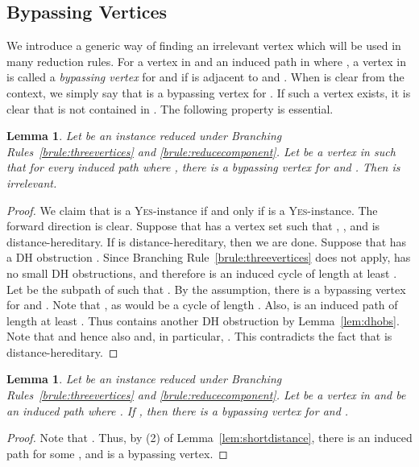 \documentclass[11pt]{elsarticle}
\newtheorem{lemma}[theorem]{Lemma}
\newcommand{\YES}{\textsc{Yes}}
\begin{document}
\subsection{Bypassing Vertices}\label{subsec:bypassing}

We introduce a generic way of finding an irrelevant vertex which will be used in many reduction rules.
For a vertex  in  and an induced path  in  where ,
a vertex  in  is called a \emph{bypassing vertex} for  and  if  is adjacent to  and . 
When  is clear from the context, we simply say that  is a bypassing vertex for . 
If such a vertex  exists, it is clear that  is not contained in .
The following property is essential.

\begin{lemma}
\label{lem:badvertex}
Let  be an instance reduced under Branching Rules~\ref{brule:threevertices} and \ref{brule:reducecomponent}.
Let  be a vertex in  such that for every induced path  where , 
there is a bypassing vertex for  and .
Then  is irrelevant.
\end{lemma}
\begin{proof}
We claim that  is a \YES-instance if and only if  is a \YES-instance.
The forward direction is clear.
Suppose that  has a vertex set  such that , , and  is distance-hereditary. 
If  is distance-hereditary, then we are done.
Suppose that  has a DH obstruction . Since Branching Rule~\ref{brule:threevertices} does not apply,  has no small DH obstructions, and therefore
 is an induced cycle of length at least . 
Let  be the subpath of  such that .
By the assumption, there is a bypassing vertex  for  and .
Note that , as  would be a cycle of length .
Also,  is an induced path of length at least . 
Thus  contains another DH obstruction by Lemma~\ref{lem:dhobs}. Note that  and hence also  and, in particular, . 
This contradicts the fact that  is distance-hereditary.
\end{proof}

\begin{lemma}
\label{lem:twovertexinS}
Let  be an instance reduced under Branching Rules~\ref{brule:threevertices} and \ref{brule:reducecomponent}.
Let  be a vertex in  and  be an induced path where .
If , then there is a bypassing vertex for  and .
\end{lemma}
\begin{proof}
Note that .
Thus, by (2) of Lemma~\ref{lem:shortdistance}, 
there is an induced path  for some , and  is a bypassing vertex.
\end{proof}
\end{document}
